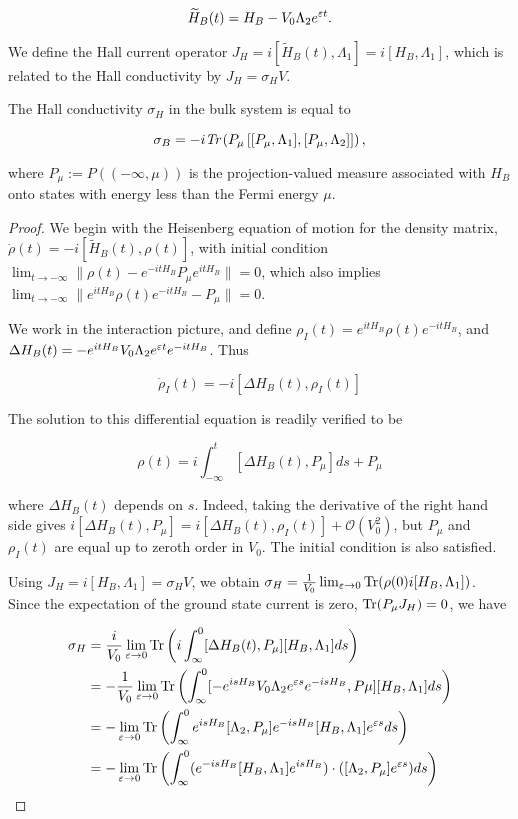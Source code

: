 \documentclass[12pt, letterpaper]{article}
\begin{document}
\[\widetilde{H}_B(t) = H_B - V_0\Lambda_2 e^{\varepsilon t}.\]

We define the Hall current operator $J_H = i[\widetilde{H}_B(t), \Lambda_1] = i[H_B,\Lambda_1]$, which is related to the Hall conductivity by $J_H = \sigma_H V$. 

\begin{proposition}

The Hall conductivity $\sigma_H$ in the bulk system is equal to 

\[\sigma_B = -i\emph{Tr}\left(P_\mu \left[[P_\mu,\Lambda_1],[P_\mu,\Lambda_2]\right]\right),\]

where $P_\mu := P((-\infty,\mu))$ is the projection-valued measure associated with $H_B$ onto states with energy less than the Fermi energy $\mu$.
\end{proposition}
\begin{proof}
We begin with the Heisenberg equation of motion for the density matrix, $\dot{\rho}(t) = - i[\widetilde{H}_B(t),\rho(t)]$, with initial condition $\lim_{t\to-\infty} \|\rho(t) - e^{-itH_B}P_\mu e^{itH_B}\| = 0$, which also implies $\lim_{t\to-\infty} \|e^{itH_B}\rho(t)e^{-itH_B} - P_\mu\| = 0$.

We work in the interaction picture, and define $\rho_I(t) = e^{itH_B}\rho(t)e^{-itH_B}$, and $\Delta H_B(t) = -e^{itH_B}V_0\Lambda_2 e^{\varepsilon t}e^{-itH_B}$. Thus

\[\dot{\rho}_I(t) = -i[\Delta H_B(t), \rho_I(t)]\]

The solution to this differential equation is readily verified to be

\[\rho(t) = i\int_{-\infty}^t [\Delta H_B(t), P_\mu]ds + P_\mu \]

where $\Delta H_B(t)$ depends on $s$. Indeed, taking the derivative of the right hand side gives $i[\Delta H_B(t), P_\mu] = i[\Delta H_B(t), \rho_I(t)] + \mathcal{O}(V_0^2)$, but $P_\mu$ and $\rho_I(t)$ are equal up to zeroth order in $V_0$. The initial condition is also satisfied. 

Using $J_H = i[H_B,\Lambda_1] = \sigma_H V$, we obtain $\sigma_H = \frac{1}{V_0} \lim_{\varepsilon\to 0} \text{Tr}(\rho(0)i[H_B,\Lambda_1])$. Since the expectation of the ground state current is zero, $\text{Tr}(P_\mu J_H) =0$, we have

\[\begin{aligned}
\sigma_H &= \frac{i}{V_0} \lim_{\varepsilon\to 0}\text{Tr} \left( i\int_{\infty}^0 [\Delta H_B(t), P_\mu] [H_B,\Lambda_1] ds\right)\\
&= -\frac{1}{V_0} \lim_{\varepsilon\to 0}\text{Tr} \left( \int_{\infty}^0 [-e^{isH_B}V_0\Lambda_2 e^{\varepsilon s}e^{-isH_B}, P\mu] [H_B,\Lambda_1] ds\right)\\
&= -\lim_{\varepsilon\to 0}\text{Tr} \left( \int_{\infty}^0 e^{isH_B}[\Lambda_2, P_\mu]e^{-isH_B}[H_B,\Lambda_1] e^{\varepsilon s}ds\right)\\
&= -\lim_{\varepsilon\to 0}\text{Tr} \left( \int_{\infty}^0 (e^{-isH_B}[H_B,\Lambda_1]e^{isH_B})\cdot([\Lambda_2, P_\mu] e^{\varepsilon s})ds\right)\\
\end{aligned}\]


\end{proof}
\end{document}
